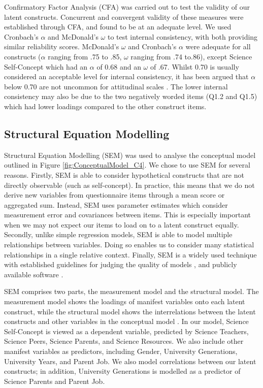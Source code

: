 Confirmatory Factor Analysis (CFA) was carried out to test the validity of our latent constructs. Concurrent and convergent validity \citep{campbell1959convergent} of these measures were established through CFA, and found to be at an adequate level. We used Cronbach's $\alpha$ and McDonald's $\omega$ to test internal consistency, with both providing similar reliability scores. McDonald's $\omega$ and Cronbach's $\alpha$ were adequate for all constructs ($\alpha$ ranging from .75 to .85, $\omega$ ranging from .74 to.86), except Science Self-Concept which had an $\alpha$ of 0.68 and an $\omega$ of .67. Whilst 0.70 is usually considered an acceptable level for internal consistency, it has been argued that $\alpha$ below 0.70 are not uncommon for attitudinal scales \citep{field2012discovering}. The lower internal consistency may also be due to the two negatively worded items (Q1.2 and Q1.5) which had lower loadings compared to the other construct items.

\subsection{Structural Equation Modelling}
Structural Equation Modelling (SEM) was used to analyse the conceptual model outlined in Figure \ref{fig:ConceptualModel_C4}. We chose to use SEM for several reasons. Firstly, SEM is able to consider hypothetical constructs that are not directly observable (such as self-concept). In practice, this means that we do not derive new variables from questionnaire items through a mean score or aggregated sum. Instead, SEM uses parameter estimates which consider measurement error and covariances between items. This is especially important when we may not expect our items to load on to a latent construct equally. Secondly, unlike simple regression models, SEM is able to model multiple relationships between variables. Doing so enables us to consider many statistical relationships in a single relative context. Finally, SEM is a widely used technique with established guidelines for judging the quality of models \citep{schreiber2006reporting}, and publicly available software \citep[e.g.][]{rosseel2012lavaan}.

SEM comprises two parts, the measurement model and the structural model. The measurement model shows the loadings of manifest variables onto each latent construct, while the structural model shows the interrelations between the latent constructs and other variables in the conceptual model \citep{schreiber2006reporting}. In our model, Science Self-Concept is viewed as a dependent variable, predicted by Science Teachers, Science Peers, Science Parents, and Science Resources. We also include other manifest variables as predictors, including Gender, University Generations, University Years, and Parent Job. We also model correlations between our latent constructs; in addition, University Generations is modelled as a predictor of Science Parents and Parent Job.

